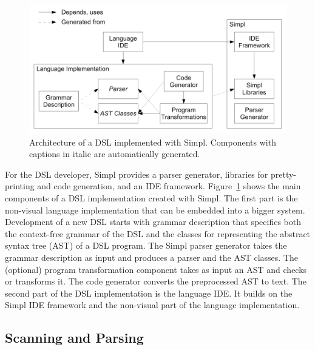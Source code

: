 \begin{figure}[!h]
\begin{centering}
\includegraphics[width=0.7\columnwidth]{simpl/architecture.pdf}
\par\end{centering}

\caption{\label{fig:architecture}Architecture of a DSL implemented with Simpl.
Components with captions in italic are automatically generated.}
\end{figure}


For the DSL developer, Simpl provides a parser generator, libraries
for pretty-printing and code generation, and an IDE framework. Figure~\ref{fig:architecture}
shows the main components of a DSL implementation created with Simpl.
The first part is the non-visual language implementation that can
be embedded into a bigger system. Development of a new DSL starts
with grammar description that specifies both the context-free grammar
of the DSL and the classes for representing the abstract syntax tree
(AST) of a DSL program. The Simpl parser generator takes the grammar
description as input and produces a parser and the AST classes. The
(optional) program transformation component takes as input an AST
and checks or transforms it. The code generator converts the preprocessed
AST to text. The second part of the DSL implementation is the language
IDE. It builds on the Simpl IDE framework and the non-visual part
of the language implementation.


\subsection{Scanning and Parsing}

